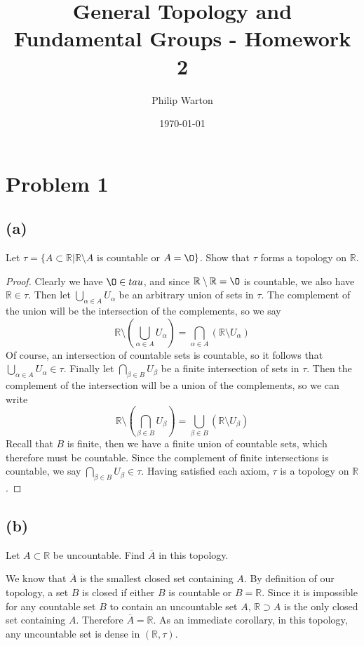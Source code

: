 \documentclass{article}
\theoremstyle{definition}
\begin{document}
\title{General Topology and Fundamental Groups - Homework 2}
\author{Philip Warton}
\date{\today}
\maketitle
\section*{Problem 1}
\subsection*{(a)}
\begin{mdframed}
    Let $\tau = \{ A \subset \mathbb{R} | \mathbb{R} \setminus A$ is countable or $A = \O \}$. Show that $\tau$
    forms a topology on $\mathbb{R}$.
\end{mdframed}
\begin{proof}
    Clearly we have $\O \in tau$, and since $\mathbb{R} \setminus \mathbb{R} = \O$ is countable, we also
    have $\mathbb{R} \in \tau$.
    Then let $\bigcup_{\alpha \in A} U_\alpha$ be an arbitrary union of sets in $\tau$.
    The complement of the union will be the intersection of the complements, so we say
    \[
        \mathbb{R} \setminus\left( \bigcup_{\alpha \in A}U_\alpha \right)= \bigcap_{\alpha \in A}\left(\mathbb{R} \setminus U_\alpha \right)
    \]
    Of course, an intersection of countable sets is countable, so it follows that $\bigcup_{\alpha \in A} U_\alpha \in \tau$. Finally let 
    $\bigcap_{\beta \in B} U_\beta$ be a finite intersection of sets in $\tau$. Then the complement of the intersection
    will be a union of the complements, so we can write 
    \[
        \mathbb{R} \setminus \left(\bigcap_{\beta \in B} U_\beta\right) = \bigcup_{\beta \in B} \left(\mathbb{R} \setminus U_\beta \right)
    \]
    Recall that $B$ is finite, then we have a finite union of countable sets, which therefore must be countable.
    Since the complement of finite intersections is countable, we say $\bigcap_{\beta \in B} U_\beta \in \tau$.
    Having satisfied each axiom, $\tau$ is a topology on $\mathbb{R}$.
\end{proof}
\subsection*{(b)}
\begin{mdframed}
    Let $A \subset \mathbb{R}$ be uncountable. Find $\overline{A}$ in this topology.
\end{mdframed}
We know that $\overline{A}$ is the smallest closed set containing $A$. By definition of our topology,
a set $B$ is closed if either $B$ is countable or $B = \mathbb{R}$. Since it is impossible for any countable 
set $B$ to contain an uncountable set $A$, $\mathbb{R} \supset A$ is the only closed set containing $A$.
Therefore $\overline{A} = \mathbb{R}$. As an immediate corollary, in this topology, any uncountable set is dense in $(\mathbb{R}, 
\tau)$.
\end{document}

